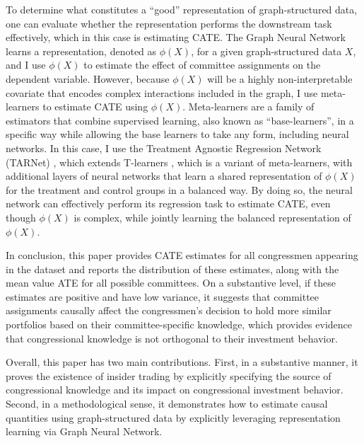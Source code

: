 \documentclass[15pt,letterpaper]{article}
\begin{document}
To determine what constitutes a ``good'' representation of graph-structured data, one can evaluate whether the representation performs the downstream task effectively, which in this case is estimating CATE. The Graph Neural Network learns a representation, denoted as $\phi(X)$, for a given graph-structured data $X$, and I use $\phi(X)$ to estimate the effect of committee assignments on the dependent variable. However, because $\phi(X)$ will be a highly non-interpretable covariate that encodes complex interactions included in the graph, I use meta-learners \citep{metalearner} to estimate CATE using $\phi(X)$. Meta-learners are a family of estimators that combine supervised learning, also known as ``base-learners'', in a specific way while allowing the base learners to take any form, including neural networks. In this case, I use the Treatment Agnostic Regression Network (TARNet) \citep{tarnet}, which extends T-learners \citep{tlearner}, which is a variant of meta-learners, with additional layers of neural networks that learn a shared representation of $\phi(X)$ for the treatment and control groups in a balanced way. By doing so, the neural network can effectively perform its regression task to estimate CATE, even though $\phi(X)$ is complex, while jointly learning the balanced representation of $\phi(X)$.

In conclusion, this paper provides CATE estimates for all congressmen appearing in the dataset and reports the distribution of these estimates, along with the mean value ATE for all possible committees. On a substantive level, if these estimates are positive and have low variance, it suggests that committee assignments causally affect the congressmen's decision to hold more similar portfolios based on their committee-specific knowledge, which provides evidence that congressional knowledge is not orthogonal to their investment behavior. 

Overall, this paper has two main contributions. First, in a substantive manner, it proves the existence of insider trading by explicitly specifying the source of congressional knowledge and its impact on congressional investment behavior. Second, in a methodological sense, it demonstrates how to estimate causal quantities using graph-structured data by explicitly leveraging representation learning via Graph Neural Network.
\end{document}
